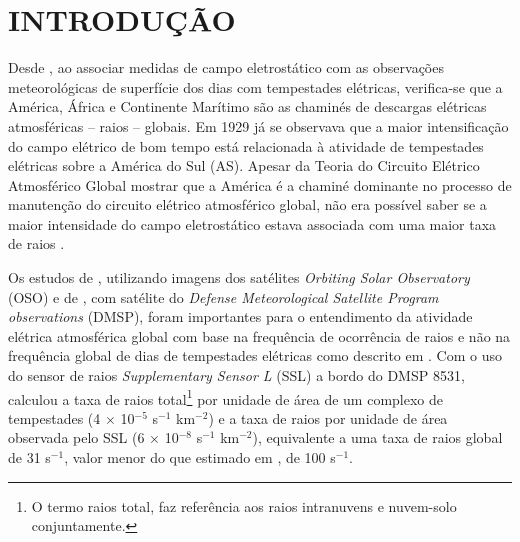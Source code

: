 \chapter{INTRODUÇÃO}

Desde , ao associar medidas de campo eletrostático com as observações meteorológicas de superfície dos dias com tempestades elétricas, verifica-se que a  América, África e Continente Marítimo são as chaminés de descargas elétricas atmosféricas -- raios -- globais. Em 1929 já se observava que a maior intensificação do campo elétrico de bom tempo está relacionada à atividade de tempestades elétricas sobre a América do Sul (AS). Apesar da Teoria do Circuito Elétrico Atmosférico Global mostrar que a América é a chaminé dominante no processo de manutenção do circuito elétrico atmosférico global, não era possível saber se a maior intensidade do campo eletrostático estava associada com uma maior taxa de raios \cite{dolezalek1972}.




Os estudos de , utilizando imagens dos satélites \textit{Orbiting Solar Observatory} (OSO) e de  , com satélite do \textit{Defense Meteorological Satellite Program observations} (DMSP), foram importantes para o entendimento da atividade elétrica atmosférica global com base na frequência de ocorrência de raios e não na frequência global de dias de tempestades elétricas como descrito em . Com o uso do sensor de raios \textit{Supplementary Sensor L} (SSL) a bordo do DMSP 8531,  calculou a taxa de raios total\footnote{ O termo raios total, faz referência aos raios intranuvens e nuvem-solo conjuntamente.} por unidade de área de um complexo de tempestades (4 $\times$ 10$^{-5}$ s$^{-1}$ km$^{-2}$) e a taxa de raios por unidade de área observada pelo SSL (6 $\times$ 10$^{-8}$ s$^{-1}$ km$^{-2}$), equivalente a uma taxa de raios global de 31 s$^{-1}$, valor menor do que estimado em , de 100 s$^{-1}$.

